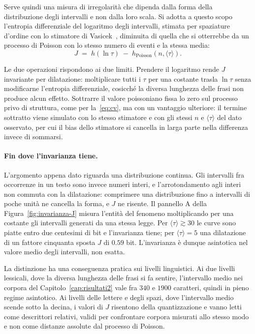 Serve quindi una misura di irregolarità che dipenda dalla forma della
distribuzione degli intervalli e non dalla loro scala. Si adotta a questo
scopo l'entropia differenziale del logaritmo degli intervalli, stimata per
spaziature d'ordine con lo stimatore di Vasicek~\cite{vasicek1976}, diminuita
di quella che si otterrebbe da un processo di Poisson con lo stesso numero di
eventi e la stessa media: \begin{equation} J \;=\; h(\ln\tau) \;-\;
h_{\mathrm{Poisson}}(n, \langle\tau\rangle). \label{eq:entropia-intervalli}
\end{equation}

Le due operazioni rispondono ai due limiti. Prendere il logaritmo rende $J$
invariante per dilatazione: moltiplicare tutti i $\tau$ per una costante trasla
$\ln\tau$ senza modificarne l'entropia differenziale, cosicché la diversa
lunghezza delle frasi non produce alcun effetto. Sottrarre il valore poissoniano
fissa lo zero sul processo privo di struttura, come per la~\eqref{eq:cv}, ma con
un vantaggio ulteriore: il termine sottratto viene simulato con lo stesso
stimatore e con gli stessi $n$ e $\langle\tau\rangle$ del dato osservato, per
cui il bias dello stimatore si cancella in larga parte nella differenza invece
di sommarsi.

\paragraph{Fin dove l'invarianza tiene.}
L'argomento appena dato riguarda una distribuzione continua. Gli intervalli fra
occorrenze in un testo sono invece numeri interi, e l'arrotondamento agli interi
non commuta con la dilatazione: comprimere una distribuzione fino a intervalli
di poche unità ne cancella la forma, e $J$ ne risente. Il pannello A della
Figura~\ref{fig:invarianza-J} misura l'entità del fenomeno moltiplicando per una
costante gli intervalli generati da una stessa legge. Per
$\langle\tau\rangle \gtrsim 30$ le curve sono piatte entro due centesimi di bit
e l'invarianza tiene; per $\langle\tau\rangle = 5$ una dilatazione di un fattore
cinquanta sposta $J$ di $0.59$ bit. L'invarianza è dunque asintotica nel valore
medio degli intervalli, non esatta.

La distinzione ha una conseguenza pratica sui livelli linguistici. Ai due
livelli lessicali, dove la diversa lunghezza delle frasi si fa sentire,
l'intervallo medio nei corpora del Capitolo~\ref{cap:risultati2} vale fra $340$
e $1900$ caratteri, quindi in pieno regime asintotico. Ai livelli delle lettere e
degli spazi, dove l'intervallo medio scende sotto la decina, i valori di $J$
risentono della quantizzazione e vanno letti come descrittori relativi, validi
per confrontare corpora misurati allo stesso modo e non come distanze assolute
dal processo di Poisson.

